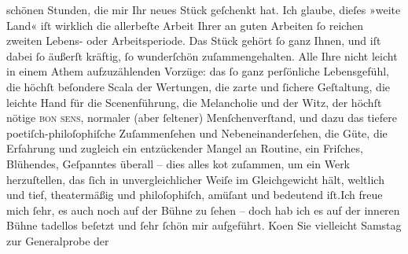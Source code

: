 \begin{ledgroupsized}[t]{13cm}
               schönen Stunden, die mir Ihr neues {\pb}Stück geſchenkt hat. Ich
               glaube, dieſes »weite Land« iſt wirklich die
               allerbeſte Arbeit Ihrer an guten Arbeiten ſo reichen zweiten Lebens- oder
               Arbeitsperiode.\pend
           \pstart
           Das Stück gehört ſo ganz Ihnen, und iſt dabei ſo äußerſt kräftig, ſo wunderſchön
               zuſammengehalten. Alle Ihre nicht leicht in einem Athem aufzuzählenden Vorzüge: das
               ſo ganz perſönliche Lebensgefühl, die höchſt beſondere Scala der Wertungen, {\pb}die zarte und ſichere Geſtaltung,
               die leichte Hand für die Scenenführung, die Melancholie und der Witz, der höchſt
               nötige \textsc{bon sens}, normaler (aber ſeltener) Menſchenverſtand,
               und dazu das tiefere poetiſch-philoſophiſche Zuſammenſehen und Nebeneinanderſehen,
               die Güte, die Erfahrung und zugleich ein entzückender Mangel an Routine, ein
               Friſches, Blühendes, Geſpanntes überall – dies alles ko{\geminationm}t zuſammen, um ein {\pb}Werk
               herzuſtellen, das ſich in unvergleichlicher Weiſe im Gleichgewicht hält, weltlich und
               tief, theatermäßig und philoſophiſch, amüſant und bedeutend iſt.\hspace*{1.5em}Ich freue mich ſehr, es auch noch auf der Bühne zu ſehen – doch hab
               ich es auf der inneren Bühne tadellos beſetzt und ſehr ſchön mir aufgeführt.\pend
           \pstart
           Ko{\geminationm}en Sie vielleicht Samstag zur
               Generalprobe der \label{K_L01968-2v}
\end{ledgroupsized}
